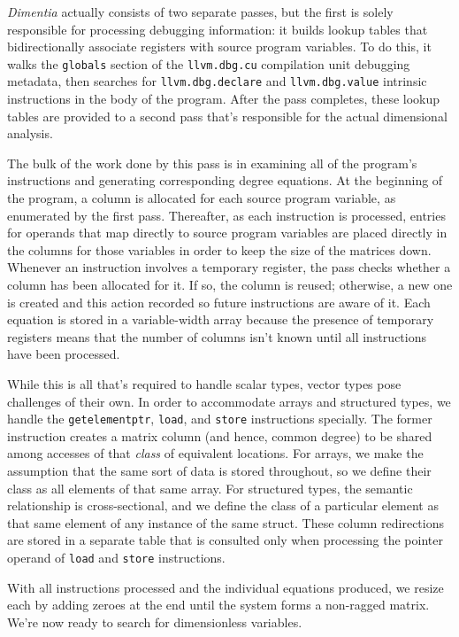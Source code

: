 \documentclass[12pt]{article}
\begin{document}
\textit{Dimentia} actually consists of two separate passes, but the first is solely responsible for processing debugging information: it builds lookup tables that bidirectionally associate registers with source program variables.
To do this, it walks the \texttt{globals} section of the \texttt{llvm.dbg.cu} compilation unit debugging metadata, then searches for \texttt{llvm.dbg.declare} and \texttt{llvm.dbg.value} intrinsic instructions in the body of the program.
After the pass completes, these lookup tables are provided to a second pass that's responsible for the actual dimensional analysis.

The bulk of the work done by this pass is in examining all of the program's instructions and generating corresponding degree equations.
At the beginning of the program, a column is allocated for each source program variable, as enumerated by the first pass.
Thereafter, as each instruction is processed, entries for operands that map directly to source program variables are placed directly in the columns for those variables in order to keep the size of the matrices down.
Whenever an instruction involves a temporary register, the pass checks whether a column has been allocated for it.
If so, the column is reused; otherwise, a new one is created and this action recorded so future instructions are aware of it.
Each equation is stored in a variable-width array because the presence of temporary registers means that the number of columns isn't known until all instructions have been processed.

While this is all that's required to handle scalar types, vector types pose challenges of their own.
In order to accommodate arrays and structured types, we handle the \texttt{getelementptr}, \texttt{load}, and \texttt{store} instructions specially.
The former instruction creates a matrix column (and hence, common degree) to be shared among accesses of that \textit{class} of equivalent locations.
For arrays, we make the assumption that the same sort of data is stored throughout, so we define their class as all elements of that same array.
For structured types, the semantic relationship is cross-sectional, and we define the class of a particular element as that same element of any instance of the same struct.
These column redirections are stored in a separate table that is consulted only when processing the pointer operand of \texttt{load} and \texttt{store} instructions.

With all instructions processed and the individual equations produced, we resize each by adding zeroes at the end until the system forms a non-ragged matrix.
We're now ready to search for dimensionless variables.
\end{document}
